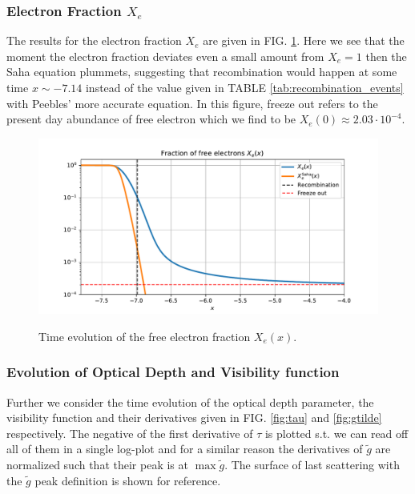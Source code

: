 \documentclass[%
reprint,
 amsmath,amssymb,
 aps,
]{revtex4-2}
\begin{document}
\subsubsection{Electron Fraction $X_e$}
The results for the electron fraction $X_e$ are given in FIG. \ref{fig:Xe}. Here we see that the moment the electron fraction deviates even a small amount from $X_e=1$ then the Saha equation plummets, suggesting that recombination would happen at some time $x\sim-7.14$ instead of the value given in TABLE \ref{tab:recombination_events} with Peebles' more accurate equation. In this figure, freeze out refers to the present day abundance of free electron which we find to be $X_e(0)\approx2.03\cdot10^{-4}$. 
\begin{figure}[ht!]
\caption{Time evolution of the free electron fraction $X_e(x)$.}
\includegraphics[width = \linewidth]{Figures/Xe.pdf}
\label{fig:Xe}
\end{figure}
\subsubsection{Evolution of Optical Depth and Visibility function}
Further we consider the time evolution of the optical depth parameter, the visibility function and their derivatives given in FIG. \ref{fig:tau} and \ref{fig:gtilde} respectively. The negative of the first derivative of $\tau$ is plotted s.t. we can read off all of them in a single log-plot and for a similar reason the derivatives of $\tilde g$ are normalized such that their peak is at $\max\tilde g$. The surface of last scattering with the $\tilde g$ peak definition is shown for reference. 
\end{document}

